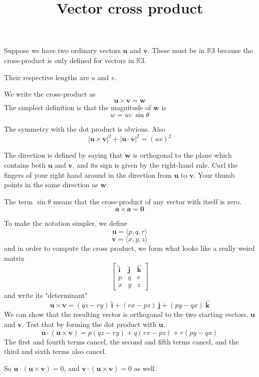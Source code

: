 \documentclass[11pt, oneside]{article}   	%
\title{Vector cross product}
\date{}
\begin{document}
\maketitle
\Large
\label{sec:Vector_cross_product}

Suppose we have two ordinary vectors $\mathbf{u}$ and $\mathbf{v}$.  These must be in $\mathbb{R}3$ because the cross-product is only defined for vectors in $\mathbb{R}3$.

Their respective lengths are $u$ and $v$.

We write the cross-product as
\[ \mathbf{u} \times \mathbf{v} = \mathbf{w}  \]
The simplest definition is that the magnitude of $\mathbf{w}$ is 
\[ w = uv \ \sin \theta \]

The symmetry with the dot product is obvious.  Also
\[ | \mathbf{u} \times \mathbf{v} |^2 + | \mathbf{u} \cdot \mathbf{v} |^2 = (uv)^2 \]

The direction is defined by saying that $\mathbf{w}$ is orthogonal to the plane which contains both $\mathbf{u}$ and $\mathbf{v}$, and its sign is given by the right-hand rule.  Curl the fingers of your right hand around in the direction from $\mathbf{u}$ to $\mathbf{v}$.  Your thumb points in the same direction as $\mathbf{w}$.  

The term $\sin \theta$ means that the cross-product of any vector with itself is zero.
\[ \mathbf{a} \times \mathbf{a} = \mathbf{0}  \]

To make the notation simpler, we define
\[ \mathbf{u} = \langle p,q,r \rangle \]
\[ \mathbf{v} = \langle x,y,z \rangle \]
and in order to compute the cross product, we form what looks like a really weird matrix
\[
\begin{bmatrix} 
  \hat{\mathbf{i}}  & \hat{\mathbf{j}}  &  \hat{\mathbf{k}} \\ 
  p  &  q & r \\
  x  &  y & z
\end{bmatrix}
\]
and write its "determinant"
\[ \mathbf{u} \times \mathbf{v}  = (qz - ry) \ \hat{\mathbf{i}} + (rx - pz) \  \hat{\mathbf{j}}  + (py - qx) \ \hat{\mathbf{k}}  \]
We can show that the resulting vector is orthogonal to the two starting vectors, $\mathbf{u}$ and $\mathbf{v}$.  Test that by forming the dot product with $\mathbf{u}$.
\[ \mathbf{u} \cdot (\mathbf{u} \times \mathbf{v})  =  p(qz - ry) + q(rx - pz)   + r(py - qx)  \] 
The first and fourth terms cancel, the second and fifth terms cancel, and the third and sixth terms also cancel.  

So $\mathbf{u} \cdot (\mathbf{u} \times \mathbf{v}) = 0$, and $\mathbf{v} \cdot (\mathbf{u} \times \mathbf{v}) = 0$ as well.  
\end{document}
